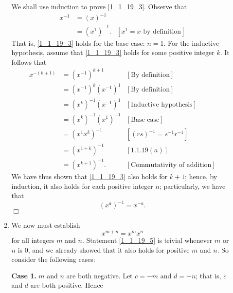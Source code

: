 \documentclass[9pt]{article}
\newcommand{\qed}{\hfill \ensuremath{\Box}}
\begin{document}
\begin{enumerate}
\begin{enumerate}
               We shall use induction to prove \eqref{1_1_19_3}. Observe that
               \begin{align*}
                  x^{-1} &= (x)^{-1} \\
                         &= (x^1)^{-1}. &[x^1 = x \text{ by definition}]
               \end{align*}
               That is, \eqref{1_1_19_3} holds for the base case: $n = 1$. For
               the inductive hypothesis, assume that \eqref{1_1_19_3} holds for
               some positive integer $k$. It follows that
               \begin{align*}
                  x^{-(k+1)} &= (x^{-1})^{k+1} &[\text{By definition}] \\
                             &= (x^{-1})^{k}(x^{-1})^1 &[\text{By definition}]\\
                             &= (x^k)^{-1}(x^{-1})^1
                                 &[\text{Inductive hypothesis}] \\
                             &= (x^k)^{-1}(x^1)^{-1} &[\text{Base case}] \\
                             &= (x^1x^k)^{-1} &[(rs)^{-1} = s^{-1}r^{-1}] \\
                             &= (x^{1+k})^{-1} &[1.1.19 (a)] \\
                             &= (x^{k+1})^{-1}.
                                 &[\text{Commutativity of addition}]
               \end{align*}
               We have thus shown that \eqref{1_1_19_3} also holds for $k+1$;
               hence, by induction, it also holds for each positive integer $n$;
               particularly, we have that
               $$(x^a)^{-1} = x^{-a}.$$ \qed
         \item We now must establish 
               \begin{equation} \label{1_1_19_5}
                  x^{m+n} = x^mx^n
               \end{equation}
               for all integers $m$ and $n$. Statement \eqref{1_1_19_5} is
               trivial whenever $m$ or $n$ is 0, and we already showed that it
               also holds for positive $m$ and $n$. So consider the following
               cases:
               
               \textbf{Case 1.} $m$ and $n$ are both negative. Let $c = -m$ and
               $d = -n$; that is, $c$ and $d$ are both positive. Hence
               

\end{enumerate}
\end{enumerate}
\end{document}
